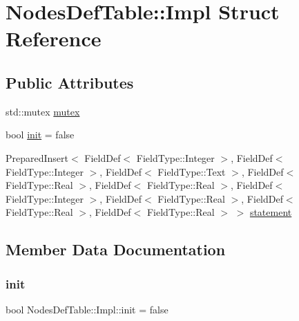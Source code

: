 \hypertarget{struct_nodes_def_table_1_1_impl}{}\section{Nodes\+Def\+Table\+::Impl Struct Reference}
\label{struct_nodes_def_table_1_1_impl}
\subsection*{Public Attributes}
\begin{DoxyCompactItemize}
\item 
std\+::mutex \mbox{\hyperlink{struct_nodes_def_table_1_1_impl_a07344919030300b8c020d5452f4248f5}{mutex}}
\item 
bool \mbox{\hyperlink{struct_nodes_def_table_1_1_impl_a75c4973da4328cbf32c29d0db45c0bdd}{init}} = false
\item 
Prepared\+Insert$<$ Field\+Def$<$ Field\+Type\+::\+Integer $>$, Field\+Def$<$ Field\+Type\+::\+Integer $>$, Field\+Def$<$ Field\+Type\+::\+Text $>$, Field\+Def$<$ Field\+Type\+::\+Real $>$, Field\+Def$<$ Field\+Type\+::\+Real $>$, Field\+Def$<$ Field\+Type\+::\+Integer $>$, Field\+Def$<$ Field\+Type\+::\+Real $>$, Field\+Def$<$ Field\+Type\+::\+Real $>$, Field\+Def$<$ Field\+Type\+::\+Real $>$ $>$ \mbox{\hyperlink{struct_nodes_def_table_1_1_impl_aeb92bf96aab16b8af80ae1ad1c72515e}{statement}}
\end{DoxyCompactItemize}


\subsection{Member Data Documentation}
\mbox{\label{struct_nodes_def_table_1_1_impl_a75c4973da4328cbf32c29d0db45c0bdd}} 
\subsubsection{\texorpdfstring{init}{init}}
{\footnotesize\ttfamily bool Nodes\+Def\+Table\+::\+Impl\+::init = false}

\mbox{\label{struct_nodes_def_table_1_1_impl_a07344919030300b8c020d5452f4248f5}} 
